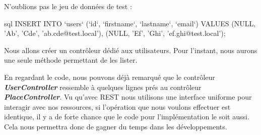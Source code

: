 \documentclass[big]{zmdocument}
\begin{document}
N'oublions pas le jeu de données de test :



\begin{CodeBlock}{sql}
INSERT INTO `users` (`id`, `firstname`, `lastname`, `email`) VALUES (NULL, 'Ab', 'Cde', 'ab.cde@test.local'), (NULL, 'Ef', 'Ghi', 'ef.ghi@test.local');
\end{CodeBlock}





Nous allons créer un contrôleur dédié aux utilisateurs. Pour l'instant, nous aurons une seule méthode permettant de les lister.






En regardant le code, nous pouvons déjà remarqué que le contrôleur \textbf{\textit{UserController}} ressemble à quelques lignes prés au contrôleur \textbf{\textit{PlaceController}}. Vu qu'avec REST nous utilisons une interface uniforme pour interagir avec nos ressources, si l'opération que nous voulons effectuer est identique, il y a de forte chance que le code pour l'implémentation le soit aussi. Cela nous permettra donc de gagner du temps dans les développements.
\end{document}
